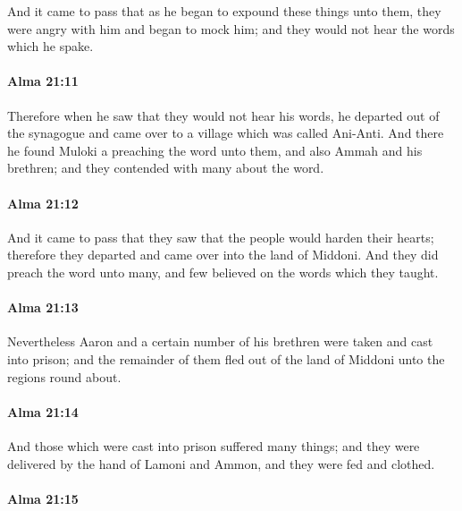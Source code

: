 			And it came to pass that as he began to expound these things unto them,
			they were angry with him and began to mock him;
			and they would not hear the words which he spake.

		\paragraph{Alma 21:11} %
			\label{ALMA-21-11}

			Therefore when he saw that they would not hear his words,
			he departed out of the synagogue
			and came over to a village which was called Ani-Anti.
			And there he found Muloki a preaching the word unto them,
			and also Ammah and his brethren;
			and they contended with many about the word.

		\paragraph{Alma 21:12} %
			\label{ALMA-21-12}

			And it came to pass that they saw that the people would harden their hearts;
			therefore they departed and came over into the land of Middoni.
			And they did preach the word unto many,
			and few believed on the words which they taught.

		\paragraph{Alma 21:13} %
			\label{ALMA-21-13}

			Nevertheless Aaron and a certain number of his brethren
			were taken and cast into prison;
			and the remainder of them fled out of the land of Middoni
			unto the regions round about.

		\paragraph{Alma 21:14} %
			\label{ALMA-21-14}

			And those which were cast into prison suffered many things;
			and they were delivered by the hand of Lamoni and Ammon,
			and they were fed and clothed.

		\paragraph{Alma 21:15} %
			\label{ALMA-21-15}

